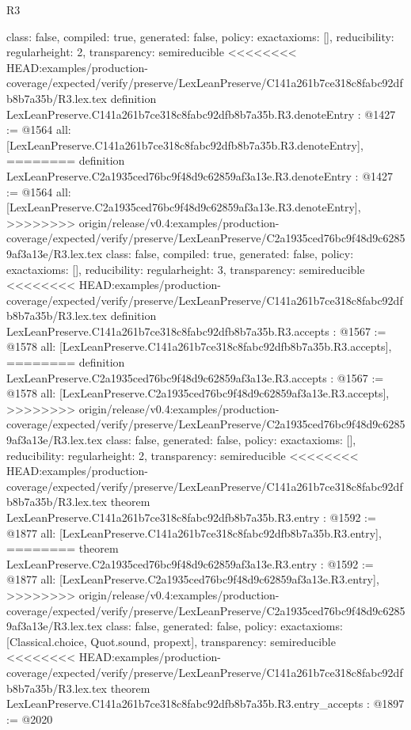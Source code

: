 \begin{lexlean}{R3}
\begin{coremodule}
{{{{{{{{{{{{  class: false,
  compiled: true,
  generated: false,
  policy: exact{axioms: []},
  reducibility: regular{height: 2},
  transparency: semireducible
}
<<<<<<<< HEAD:examples/production-coverage/expected/verify/preserve/LexLeanPreserve/C141a261b7ce318c8fabc92dfb8b7a35b/R3.lex.tex
definition LexLeanPreserve.C141a261b7ce318c8fabc92dfb8b7a35b.R3.denoteEntry : @1427 := @1564 {
  all: [LexLeanPreserve.C141a261b7ce318c8fabc92dfb8b7a35b.R3.denoteEntry],
========
definition LexLeanPreserve.C2a1935ced76bc9f48d9c62859af3a13e.R3.denoteEntry : @1427 := @1564 {
  all: [LexLeanPreserve.C2a1935ced76bc9f48d9c62859af3a13e.R3.denoteEntry],
>>>>>>>> origin/release/v0.4:examples/production-coverage/expected/verify/preserve/LexLeanPreserve/C2a1935ced76bc9f48d9c62859af3a13e/R3.lex.tex
  class: false,
  compiled: true,
  generated: false,
  policy: exact{axioms: []},
  reducibility: regular{height: 3},
  transparency: semireducible
}
<<<<<<<< HEAD:examples/production-coverage/expected/verify/preserve/LexLeanPreserve/C141a261b7ce318c8fabc92dfb8b7a35b/R3.lex.tex
definition LexLeanPreserve.C141a261b7ce318c8fabc92dfb8b7a35b.R3.accepts : @1567 := @1578 {
  all: [LexLeanPreserve.C141a261b7ce318c8fabc92dfb8b7a35b.R3.accepts],
========
definition LexLeanPreserve.C2a1935ced76bc9f48d9c62859af3a13e.R3.accepts : @1567 := @1578 {
  all: [LexLeanPreserve.C2a1935ced76bc9f48d9c62859af3a13e.R3.accepts],
>>>>>>>> origin/release/v0.4:examples/production-coverage/expected/verify/preserve/LexLeanPreserve/C2a1935ced76bc9f48d9c62859af3a13e/R3.lex.tex
  class: false,
  generated: false,
  policy: exact{axioms: []},
  reducibility: regular{height: 2},
  transparency: semireducible
}
<<<<<<<< HEAD:examples/production-coverage/expected/verify/preserve/LexLeanPreserve/C141a261b7ce318c8fabc92dfb8b7a35b/R3.lex.tex
theorem LexLeanPreserve.C141a261b7ce318c8fabc92dfb8b7a35b.R3.entry : @1592 := @1877 {
  all: [LexLeanPreserve.C141a261b7ce318c8fabc92dfb8b7a35b.R3.entry],
========
theorem LexLeanPreserve.C2a1935ced76bc9f48d9c62859af3a13e.R3.entry : @1592 := @1877 {
  all: [LexLeanPreserve.C2a1935ced76bc9f48d9c62859af3a13e.R3.entry],
>>>>>>>> origin/release/v0.4:examples/production-coverage/expected/verify/preserve/LexLeanPreserve/C2a1935ced76bc9f48d9c62859af3a13e/R3.lex.tex
  class: false,
  generated: false,
  policy: exact{axioms: [Classical.choice, Quot.sound, propext]},
  transparency: semireducible
}
<<<<<<<< HEAD:examples/production-coverage/expected/verify/preserve/LexLeanPreserve/C141a261b7ce318c8fabc92dfb8b7a35b/R3.lex.tex
theorem LexLeanPreserve.C141a261b7ce318c8fabc92dfb8b7a35b.R3.entry_accepts : @1897 := @2020 {
}}}}}}}}}}}}}}}
\end{coremodule}
\end{lexlean}
